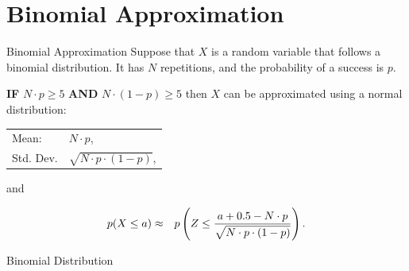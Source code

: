 \section{Binomial Approximation}

\begin{frame}

  \begin{block}{Binomial Approximation}
    Suppose that $X$ is a random variable that follows a binomial
    distribution. It has $N$ repetitions, and the probability of a
    success is $p$. 

    \textbf{IF} $N\cdot p\geq 5$ \textbf{AND} $N\cdot (1-p) \geq 5$
    then $X$ can be approximated using a normal distribution:

    \begin{center}
      \begin{tabular}{ll}
        Mean: & $N\cdot p$, \\
        Std. Dev. & $\sqrt{N\cdot p \cdot (1-p)}$,
      \end{tabular}
    \end{center}

    and

    \begin{eqnarray*}
      p(X \leq a) & \approx &
       p\left( Z \leq \frac{a+0.5-N\cdot p}{\sqrt{N\cdot p \cdot (1-p)}}\right).
    \end{eqnarray*}

  \end{block}

\end{frame}

\begin{frame}{Binomial Distribution}

  
\end{frame}

